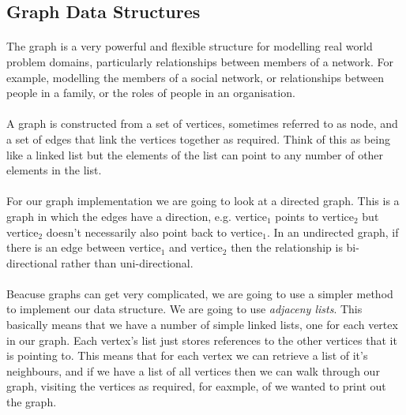 \documentclass[10pt, a4paper, twosize]{article}
\begin{document}
\subsection{Graph Data Structures}
\paragraph{} The graph is a very powerful and flexible structure for modelling real world problem domains, particularly relationships between members of a network. For example, modelling the members of a social network, or relationships between people in a family, or the roles of people in an organisation.

\paragraph{} A graph is constructed from a set of vertices, sometimes referred to as node, and a set of edges that link the vertices together as required. Think of this as being like a linked list but the elements of the list can point to any number of other elements in the list.

\paragraph{} For our graph implementation we are going to look at a directed graph. This is a graph in which the edges have a direction, e.g. vertice$_{1}$ points to vertice$_{2}$ but vertice$_{2}$ doesn't necessarily also point back to vertice$_{1}$. In an undirected graph, if there is an edge between vertice$_{1}$ and vertice$_{2}$ then the relationship is bi-directional rather than uni-directional.

\paragraph{} Beacuse graphs can get very complicated, we are going to use a simpler method to implement our data structure. We are going to use \emph{adjaceny lists}. This basically means that we have a number of simple linked lists, one for each vertex in our graph. Each vertex's list just stores references to the other vertices that it is pointing to. This means that for each vertex we can retrieve a list of it's neighbours, and if we have a list of all vertices then we can walk through our graph, visiting the vertices as required, for eaxmple, of we wanted to print out the graph.
\end{document}
